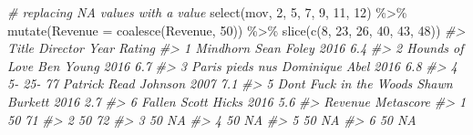\documentclass[
]{book}
\newenvironment{Shaded}{\begin{snugshade}}{\end{snugshade}}
\newcommand{\AttributeTok}[1]{\textcolor[rgb]{0.77,0.63,0.00}{#1}}
\newcommand{\CommentTok}[1]{\textcolor[rgb]{0.56,0.35,0.01}{\textit{#1}}}
\newcommand{\DecValTok}[1]{\textcolor[rgb]{0.00,0.00,0.81}{#1}}
\newcommand{\FunctionTok}[1]{\textcolor[rgb]{0.00,0.00,0.00}{#1}}
\newcommand{\NormalTok}[1]{#1}
\newcommand{\SpecialCharTok}[1]{\textcolor[rgb]{0.00,0.00,0.00}{#1}}
\begin{document}
\begin{Shaded}
\begin{Highlighting}[]
\CommentTok{\# replacing NA values with a value}
\FunctionTok{select}\NormalTok{(mov, }\DecValTok{2}\NormalTok{, }\DecValTok{5}\NormalTok{, }\DecValTok{7}\NormalTok{, }\DecValTok{9}\NormalTok{, }\DecValTok{11}\NormalTok{, }\DecValTok{12}\NormalTok{) }\SpecialCharTok{\%\textgreater{}\%}
  \FunctionTok{mutate}\NormalTok{(}\AttributeTok{Revenue =} \FunctionTok{coalesce}\NormalTok{(Revenue, }\DecValTok{50}\NormalTok{)) }\SpecialCharTok{\%\textgreater{}\%}
  \FunctionTok{slice}\NormalTok{(}\FunctionTok{c}\NormalTok{(}\DecValTok{8}\NormalTok{, }\DecValTok{23}\NormalTok{, }\DecValTok{26}\NormalTok{, }\DecValTok{40}\NormalTok{, }\DecValTok{43}\NormalTok{, }\DecValTok{48}\NormalTok{))}
\CommentTok{\#\textgreater{}                     Title             Director Year Rating}
\CommentTok{\#\textgreater{} 1                Mindhorn           Sean Foley 2016    6.4}
\CommentTok{\#\textgreater{} 2          Hounds of Love            Ben Young 2016    6.7}
\CommentTok{\#\textgreater{} 3         Paris pieds nus       Dominique Abel 2016    6.8}
\CommentTok{\#\textgreater{} 4               5{-} 25{-} 77 Patrick Read Johnson 2007    7.1}
\CommentTok{\#\textgreater{} 5 Don\textquotesingle{}t Fuck in the Woods        Shawn Burkett 2016    2.7}
\CommentTok{\#\textgreater{} 6                  Fallen          Scott Hicks 2016    5.6}
\CommentTok{\#\textgreater{}   Revenue Metascore}
\CommentTok{\#\textgreater{} 1      50        71}
\CommentTok{\#\textgreater{} 2      50        72}
\CommentTok{\#\textgreater{} 3      50        NA}
\CommentTok{\#\textgreater{} 4      50        NA}
\CommentTok{\#\textgreater{} 5      50        NA}
\CommentTok{\#\textgreater{} 6      50        NA}


\end{Highlighting}
\end{Shaded}
\end{document}
